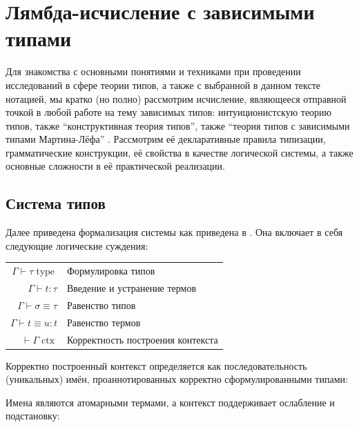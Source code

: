 \documentclass[12pt]{article}
\DeclareMathOperator{\ctx}{ctx}
\DeclareMathOperator{\type}{type}
\begin{document}
\section{Лямбда-исчисление с зависимыми типами}

Для знакомства с основными понятиями и техниками при проведении исследований в
сфере теории типов, а также с выбранной в данном тексте нотацией, мы кратко (но
полно) рассмотрим исчисление, являющееся отправной точкой в любой работе на тему
зависимых типов: интуиционистскую теорию типов, также ``конструктивная теория
типов'', также ``теория типов с зависимыми типами Мартина-Лёфа'' \cite{mltt}.
Рассмотрим её декларативные правила типизации, грамматические конструкции, её
свойства в качестве логической системы, а также основные сложности в её
практической реализации.

\subsection{Система типов}

Далее приведена формализация системы как приведена в \cite{hott}. Она
включает в себя следующие логические суждения:

\begin{center}
\begin{tabular}{rl}
  $\Gamma \vdash \tau \type$ & Формулировка типов \\
  $\Gamma \vdash t : \tau$ & Введение и устранение термов \\
  $\Gamma \vdash \sigma \equiv \tau$ & Равенство типов \\
  $\Gamma \vdash t \equiv u : t$ & Равенство термов \\
  $\vdash \Gamma \ctx$ & Корректность построения контекста
\end{tabular}
\end{center}

Корректно построенный контекст определяется как последовательность (уникальных)
имён, проаннотированных корректно сформулированными типами:

Имена являются атомарными термами, а контекст поддерживает ослабление и
подстановку:
\end{document}
